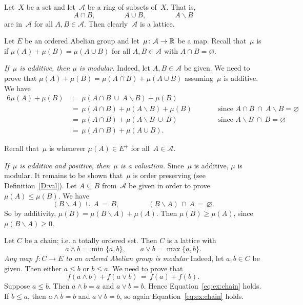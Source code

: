 \documentclass[main.tex]{subfiles}
\begin{document}
\begin{ex}
Let~$X$ be a set and let~$\mathcal{A}$ be a ring of subsets of~$X$.
That is,
\begin{equation*}
A\cap B,\qquad\qquad A\cup B,\qquad\qquad A\backslash B
\end{equation*}
are in~$\mathcal{A}$ for all $A,B\in\mathcal{A}$.
Then clearly~$\mathcal{A}$ is a lattice.

Let $E$ be an ordered Abelian group
and let~$\mu\colon \mathcal{A}\rightarrow \mathbb{R}$ be a map.
Recall that~$\mu$ is  if $\mu(A) + \mu(B) = \mu(A\cup B)$
for all $A,B\in\mathcal{A}$ with $A\cap B=\varnothing$.

\emph{If~$\mu$ is additive,
then $\mu$ is modular.}
Indeed,
let $A,B\in \mathcal{A}$ be given. We need to prove that
$\mu(A) + \mu(B) =\mu(A\cap B) + \mu(A\cup B)$
assuming~$\mu$ is additive.
We have
\begin{alignat*}{6}
\mu(A) + \mu(B) \,
  & =\, \mu(A\cap B \ \cup\ A\backslash B) + \mu(B) \\ 
  & =\, \mu(A\cap B) + \mu(A\backslash B)  + \mu(B)\qquad
    && \text{since } A\cap B \ \cap\ A\backslash B = \varnothing \\ 
  & =\, \mu(A\cap B) + \mu(A\backslash B \ \cup\ B ) 
    && \text{since } A\backslash B\ \cap\ B = \varnothing \\
  & =\, \mu(A\cap B) + \mu(A\cup B).
\end{alignat*}

Recall that~$\mu$ is  whenever
$\mu(A)\in E^+$ for all~$A\in\mathcal{A}$.

\emph{If~$\mu$ is additive and positive,
then~$\mu$ is a valuation.}
Since~$\mu$ is additive,
$\mu$ is modular.
It remains to be shown that~$\mu$ is order preserving
(see Definition~\ref{D:val}).
Let $A\subseteq B$ from~$\mathcal{A}$ be given
in order to prove $\mu(A)\leq \mu(B)$.
We have
\begin{equation*}
(B\backslash A)\,\cup\, A\,=\,B,\qquad\qquad 
(B\backslash A)\,\cap\, A\,=\,\varnothing.
\end{equation*}
So by additivity, 
$\mu(B)=\mu(B\backslash A)+\mu(A)$.
Then $\mu(B)\geq \mu(A)$, since $\mu(B\backslash A)\geq 0$.
\end{ex}

\begin{ex}
Let $C$ be a chain;
i.e. a totally ordered set.
Then $C$ is a lattice with
\begin{equation*}
a\wedge b = \min\{a,b\},
 \qquad 
a\vee b = \max\{a,b\}.
\end{equation*}
\emph{Any map $f\colon C\rightarrow E$
to an ordered Abelian group is modular}
Indeed,
let $a,b\in C$ be given.
Then either $a\leq b$ or $b\leq a$.
We need to prove that 
\begin{equation}
\label{eq:ex:chain}
f(a\wedge b) + f(a \vee b) \,=\, f(a) + f(b).
\end{equation}
Suppose $a\leq b$. Then $a\wedge b = a$ and $a \vee b= b$.
Hence Equation~\eqref{eq:ex:chain} holds.  
If $b\leq a$, then $a\wedge b = b$ and $a \vee b = b$,
so again Equation~\eqref{eq:ex:chain} holds.
\end{ex}
\end{document}
